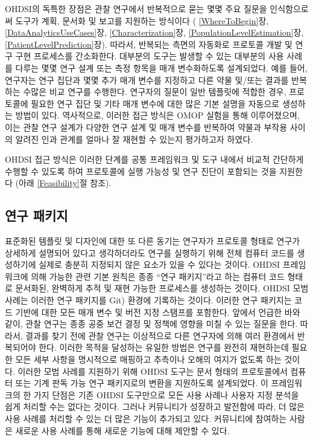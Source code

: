 \documentclass[10.5pt]{book}
\theoremstyle{definition}
\theoremstyle{definition}
\theoremstyle{definition}
\theoremstyle{remark}
\begin{document}
OHDSI의 독특한 장점은 관찰 연구에서 반복적으로 묻는 몇몇 주요 질문을
인식함으로써 도구가 계획, 문서화 및 보고를 지원하는 방식이다 (
\ref{WhereToBegin}장, \ref{DataAnalyticsUseCases}장,
\ref{Characterization}장, \ref{PopulationLevelEstimation}장,
\ref{PatientLevelPrediction}장). 따라서, 반복되는 측면의 자동화로
프로토콜 개발 및 연구 구현 프로세스를 간소화한다. 대부분의 도구는 발생할
수 있는 대부분의 사용 사례를 다루는 몇몇 연구 설계 또는 측정 항목을 매개
변수화하도록 설계되었다. 예를 들어, 연구자는 연구 집단과 몇몇 추가 매개
변수를 지정하고 다른 약물 및/또는 결과를 반복하는 수많은 비교 연구를
수행한다. 연구자의 질문이 일반 템플릿에 적합한 경우, 프로토콜에 필요한
연구 집단 및 기타 매개 변수에 대한 많은 기본 설명을 자동으로 생성하는
방법이 있다. 역사적으로, 이러한 접근 방식은 OMOP 실험을 통해
이루어졌으며, 이는 관찰 연구 설계가 다양한 연구 설계 및 매개 변수를
반복하여 약물과 부작용 사이의 알려진 인과 관계를 얼마나 잘 재현할 수
있는지 평가하고자 하였다.

OHDSI 접근 방식은 이러한 단계를 공통 프레임워크 및 도구 내에서 비교적
간단하게 수행할 수 있도록 하여 프로토콜에 실행 가능성 및 연구 진단이
포함되는 것을 지원한다 (아래 \ref{Feasibility}절 참조).

\subsection{연구 패키지}\label{-}


표준화된 템플릿 및 디자인에 대한 또 다른 동기는 연구자가 프로토콜 형태로
연구가 상세하게 설명되어 있다고 생각하더라도 연구를 실행하기 위해 전체
컴퓨터 코드를 생성하기에 실제로 충분히 지정되지 않은 요소가 있을 수
있다는 것이다. OHDSI 프레임워크에 의해 가능한 관련 기본 원칙은 종종
``연구 패키지''라고 하는 컴퓨터 코드 형태로 문서화된, 완벽하게 추적 및
재현 가능한 프로세스를 생성하는 것이다. OHDSI 모범 사례는 이러한 연구
패키지를 Git) 환경에 기록하는 것이다. 이러한 연구 패키지는 코드 기반에
대한 모든 매개 변수 및 버전 지정 스탬프를 포함한다. 앞에서 언급한 바와
같이, 관찰 연구는 종종 공중 보건 결정 및 정책에 영향을 미칠 수 있는
질문을 한다. 따라서, 결과를 찾기 전에 관찰 연구는 이상적으로 다른
연구자에 의해 여러 환경에서 반복되어야 한다. 이러한 목적을 달성하는
유일한 방법은 연구를 완전히 재현하는데 필요한 모든 세부 사항을
명시적으로 매핑하고 추측이나 오해의 여지가 없도록 하는 것이다. 이러한
모범 사례를 지원하기 위해 OHDSI 도구는 문서 형태의 프로토콜에서 컴퓨터
또는 기계 판독 가능 연구 패키지로의 변환을 지원하도록 설계되었다. 이
프레임워크의 한 가지 단점은 기존 OHDSI 도구만으로 모든 사용 사례나
사용자 지정 분석을 쉽게 처리할 수는 없다는 것이다. 그러나 커뮤니티가
성장하고 발전함에 따라, 더 많은 사용 사례를 처리할 수 있는 더 많은
기능이 추가되고 있다. 커뮤니티에 참여하는 사람은 새로운 사용 사례를 통해
새로운 기능에 대해 제안할 수 있다.
\end{document}
